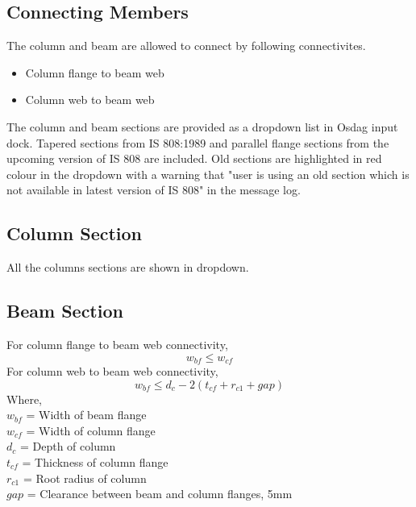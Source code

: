 \documentclass[11.5pt,a4paper,oneside]{report}
\begin{document}
\begin{Form}
\chapter{Connecting Members}
%
The column and beam are allowed to connect by following connectivites.
\begin{itemize}
	\item Column flange to beam web
	\item Column web to beam web
\end{itemize}
%
The column and beam sections are provided as a dropdown list in Osdag input dock. Tapered sections from IS 808:1989 and parallel flange sections from the upcoming version of IS 808 are included. Old sections are highlighted in red colour in the dropdown with a warning that "user is using an old section which is not available in latest version of IS 808" in the message log.
%
\section{Column Section}
%
All the columns sections are shown in dropdown.
\section{Beam Section}
%
For column flange to beam web connectivity, 
\begin{equation}
	w_{bf} \le w_{cf}
\end{equation}
%
For column web to beam web connectivity,
\begin{equation}
	w_{bf} \le d_c - 2 (t_{cf} + r_{c1} + gap)
\end{equation}
Where, \\
\indent $w_{bf}$ = Width of beam flange \\
\indent $w_{cf}$ =  Width of column flange \\
\indent $d_c$ = Depth of column \\
\indent $t_{cf}$ = Thickness of column flange \\
\indent $r_{c1}$ = Root radius of column \\
\indent $gap$ = Clearance between beam and column flanges, 5mm



\end{Form}
\end{document}
